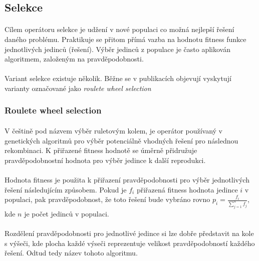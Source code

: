 \documentclass[bc,male,java,dept460]{diploma}		%
\begin{document}
\subsection{Selekce}
\paragraph*{}
Cílem operátoru selekce je udžení v nové populaci co možná nejlepší řešení daného problému. Praktikuje se přitom přímá vazba na hodnotu fitness funkce jednotlivých jedinců (řešení). Výběr jedinců z populace je často aplikován  algoritmem, založeným na pravděpodobnosti.

\paragraph*{}
Variant selekce existuje několik. Běžne se v publikacích objevují vyskytují varianty označované jako \textit{roulete wheel selection}

\subsubsection*{Roulete wheel selection}
\paragraph*{}
V češtině pod názvem výběr ruletovým kolem, je operátor používaný v genetických algoritmů pro výběr potenciálně vhodných řešení pro následnou rekombinaci. K přiřazené fitness hodnotě se úměrně přidružuje pravděpodobnostní hodnota pro výběr jedince k další reprodukci. 

\paragraph*{}
Hodnota fitness je použita k přiřazení pravděpodobnosti pro výběr jednotlivých řešení následujícím způsobem. Pokud je $f_i$ přiřazená fitness hodnota jedince $i$ v populaci, pak pravděpodobnost, že toto řešení bude vybráno rovno $p_i=\frac{f_i}{\sum\limits_{j=1}^n f_j}$, kde $n$ je počet jedinců v populaci.

\paragraph*{}
Rozdělení pravděpodobnosti pro jednotlivé jedince si lze dobře představit na kole s výšeči, kde plocha každé výseči reprezentuje velikost pravděpodobností každého řešení. Odtud tedy název tohoto algoritmu.
\end{document}
